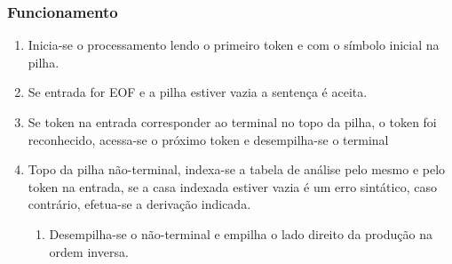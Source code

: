 \documentclass[11pt]{article}
\begin{document}
\subsubsection{Funcionamento}
\label{sec:org4b56726}
\begin{enumerate}
\item Inicia-se o processamento lendo o primeiro token e com o
símbolo inicial na pilha.
\item Se entrada for EOF e a pilha estiver vazia a sentença é aceita.
\item Se token na entrada corresponder ao terminal no topo da pilha,
o token foi reconhecido, acessa-se o próximo token e
desempilha-se o terminal
\item Topo da pilha não-terminal, indexa-se a tabela de análise pelo
mesmo e pelo token na entrada, se a casa indexada estiver vazia
é um erro sintático, caso contrário, efetua-se a derivação indicada.
\begin{enumerate}
\item Desempilha-se o não-terminal e empilha o lado direito da
produção na ordem inversa.
\end{enumerate}
\end{enumerate}
\end{document}
